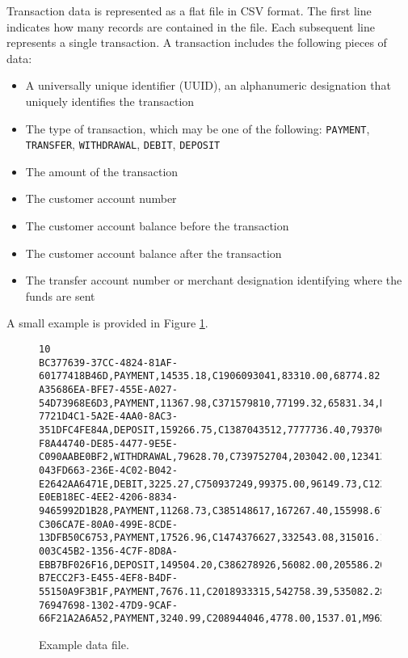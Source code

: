 \documentclass[12pt]{scrartcl}
\begin{document}
Transaction data is represented as a flat file in CSV format.  The first line
indicates how many records are contained in the file.  Each subsequent line 
represents a single transaction.  A transaction includes the following pieces
of data:
\begin{itemize}
  \item A universally unique identifier (UUID), an alphanumeric designation 
    that uniquely identifies the transaction
  \item The type of transaction, which may be one of the following:
    \texttt{PAYMENT}, \texttt{TRANSFER}, \texttt{WITHDRAWAL}, 
    \texttt{DEBIT}, \texttt{DEPOSIT}
  \item The amount of the transaction
  \item The customer account number
  \item The customer account balance before the transaction
  \item The customer account balance after the transaction
  \item The transfer account number or merchant designation identifying where the funds are sent 
\end{itemize}
A small example is provided in Figure \ref{figure:dataFile}.

\begin{figure}[ht]
\begin{verbatim}
10
BC377639-37CC-4824-81AF-60177418B46D,PAYMENT,14535.18,C1906093041,83310.00,68774.82,M95867054
A35686EA-BFE7-455E-A027-54D73968E6D3,PAYMENT,11367.98,C371579810,77199.32,65831.34,M1932650331
7721D4C1-5A2E-4AA0-8AC3-351DFC4FE84A,DEPOSIT,159266.75,C1387043512,7777736.40,7937003.15,C553899299
F8A44740-DE85-4477-9E5E-C090AABE0BF2,WITHDRAWAL,79628.70,C739752704,203042.00,123413.30,C579345824
043FD663-236E-4C02-B042-E2642AA6471E,DEBIT,3225.27,C750937249,99375.00,96149.73,C1232504595
E0EB18EC-4EE2-4206-8834-9465992D1B28,PAYMENT,11268.73,C385148617,167267.40,155998.67,M1084205719
C306CA7E-80A0-499E-8CDE-13DFB50C6753,PAYMENT,17526.96,C1474376627,332543.08,315016.12,M1944361847
003C45B2-1356-4C7F-8D8A-EBB7BF026F16,DEPOSIT,149504.20,C386278926,56082.00,205586.20,C1113941243
B7ECC2F3-E455-4EF8-B4DF-55150A9F3B1F,PAYMENT,7676.11,C2018933315,542758.39,535082.28,M1018630839
76947698-1302-47D9-9CAF-66F21A2A6A52,PAYMENT,3240.99,C208944046,4778.00,1537.01,M962275185
\end{verbatim}
\caption{Example data file.}
\label{figure:dataFile}
\end{figure}
\end{document}
